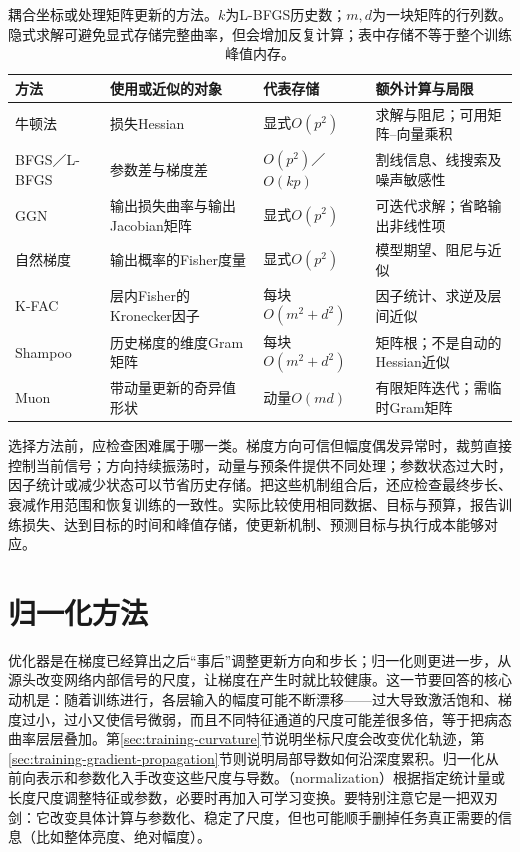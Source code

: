 \begin{table}[htbp]
  \centering\small
  \begin{tabularx}{\linewidth}{@{}p{27mm}p{43mm}p{31mm}X@{}}
    \toprule
    方法 & 使用或近似的对象 & 代表存储 & 额外计算与局限 \\
    \midrule
    牛顿法 & 损失Hessian & 显式$O(p^2)$ & 求解与阻尼；可用矩阵--向量乘积 \\
    BFGS／L-BFGS & 参数差与梯度差 & $O(p^2)$／$O(kp)$ & 割线信息、线搜索及噪声敏感性 \\
    GGN & 输出损失曲率与输出Jacobian矩阵 & 显式$O(p^2)$ & 可迭代求解；省略输出非线性项 \\
    自然梯度 & 输出概率的Fisher度量 & 显式$O(p^2)$ & 模型期望、阻尼与近似 \\
    K-FAC & 层内Fisher的Kronecker因子 & 每块$O(m^2+d^2)$ & 因子统计、求逆及层间近似 \\
    Shampoo & 历史梯度的维度Gram矩阵 & 每块$O(m^2+d^2)$ & 矩阵根；不是自动的Hessian近似 \\
    Muon & 带动量更新的奇异值形状 & 动量$O(md)$ & 有限矩阵迭代；需临时Gram矩阵 \\
    \bottomrule
  \end{tabularx}
  \caption{耦合坐标或处理矩阵更新的方法。$k$为L-BFGS历史数；$m,d$为一块矩阵的行列数。隐式求解可避免显式存储完整曲率，但会增加反复计算；表中存储不等于整个训练峰值内存。}
  \label{tab:training-matrix-comparison}
\end{table}
\FloatBarrier

选择方法前，应检查困难属于哪一类。梯度方向可信但幅度偶发异常时，裁剪直接控制当前信号；方向持续振荡时，动量与预条件提供不同处理；参数状态过大时，因子统计或减少状态可以节省历史存储。把这些机制组合后，还应检查最终步长、衰减作用范围和恢复训练的一致性。实际比较使用相同数据、目标与预算，报告训练损失、达到目标的时间和峰值存储，使更新机制、预测目标与执行成本能够对应。

\section{归一化方法}
\label{sec:training-normalization}
优化器是在梯度已经算出之后“事后”调整更新方向和步长；归一化则更进一步，从源头改变网络内部信号的尺度，让梯度在产生时就比较健康。这一节要回答的核心动机是：随着训练进行，各层输入的幅度可能不断漂移——过大导致激活饱和、梯度过小，过小又使信号微弱，而且不同特征通道的尺度可能差很多倍，等于把病态曲率层层叠加。第\ref{sec:training-curvature}节说明坐标尺度会改变优化轨迹，第\ref{sec:training-gradient-propagation}节则说明局部导数如何沿深度累积。归一化从前向表示和参数化入手改变这些尺度与导数。（normalization）根据指定统计量或长度尺度调整特征或参数，必要时再加入可学习变换。要特别注意它是一把双刃剑：它改变具体计算与参数化、稳定了尺度，但也可能顺手删掉任务真正需要的信息（比如整体亮度、绝对幅度）。

